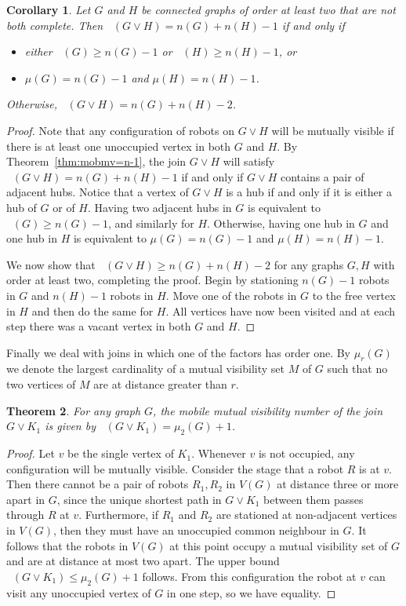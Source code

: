 \documentclass[a4paper,12pt]{article}
\DeclareMathOperator{\mobmv}{Mob_{\mu}}
\newtheorem{theorem}{Theorem}[section]
\newtheorem{corollary}[theorem]{Corollary}
\theoremstyle{definition}
\begin{document}
	\begin{corollary}
		Let $G$ and $H$ be connected graphs of order at least two that are not both complete. Then $\mobmv (G \vee H) = n(G)+n(H)-1$ if and only if
		\begin{itemize}
			\item either $\mobmv (G) \geq n(G)-1$ or $\mobmv (H) \geq n(H)-1$, or
			\item $\mu (G) = n(G)-1$ and $\mu (H) = n(H)-1$.
		\end{itemize}
		Otherwise, $\mobmv(G \vee H) = n(G)+n(H)-2$. 
	\end{corollary}
	\begin{proof}
		Note that any configuration of robots on $G \vee H$ will be mutually visible if there is at least one unoccupied vertex in both $G$ and $H$. By Theorem~\ref{thm:mobmv=n-1}, the join $G \vee H$ will satisfy $\mobmv (G \vee H) = n(G)+n(H)-1$ if and only if $G \vee H$ contains a pair of adjacent hubs. Notice that a vertex of $G \vee H$ is a hub if and only if it is either a hub of $G$ or of $H$. Having two adjacent hubs in $G$ is equivalent to $\mobmv(G) \geq n(G)-1$, and similarly for $H$. Otherwise, having one hub in $G$ and one hub in $H$ is equivalent to $\mu (G) = n(G) -1$ and $\mu (H) = n(H)-1$.
		
		We now show that $\mobmv(G \vee H) \geq n(G)+n(H)-2$ for any graphs $G,H$ with order at least two, completing the proof. Begin by stationing $n(G) - 1$ robots in $G$ and $n(H) - 1$ robots in $H$. Move one of the robots in $G$ to the free vertex in $H$ and then do the same for $H$. All vertices have now been visited and at each step there was a vacant vertex in both $G$ and $H$.
	\end{proof}
	
	Finally we deal with joins in which one of the factors has order one. By $\mu _r(G)$ we denote the largest cardinality of a mutual visibility set $M$ of $G$ such that no two vertices of $M$ are at distance greater than $r$.
	
	\begin{theorem}
		For any graph $G$, the mobile mutual visibility number of the join $G \vee K_1$ is given by $\mobmv(G \vee K_1) = \mu _2(G) + 1$. 
	\end{theorem}
	\begin{proof}
		Let $v$ be the single vertex of $K_1$. Whenever $v$ is not occupied, any configuration will be mutually visible. Consider the stage that a robot $R$ is at $v$. Then there cannot be a pair of robots $R_1,R_2$ in $V(G)$ at distance three or more apart in $G$, since the unique shortest path in $G \vee K_1$ between them passes through $R$ at $v$. Furthermore, if $R_1$ and $R_2$ are stationed at non-adjacent vertices in $V(G)$, then they must have an unoccupied common neighbour in $G$. It follows that the robots in $V(G)$ at this point occupy a mutual visibility set of $G$ and are at distance at most two apart. The upper bound $\mobmv (G \vee K_1) \leq \mu _2(G)+1$ follows. From this configuration the robot at $v$ can visit any unoccupied vertex of $G$ in one step, so we have equality.
	\end{proof}
	
\end{document}
